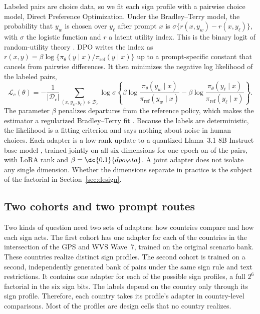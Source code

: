 Labeled pairs are choice data, so we fit each sign profile with a pairwise choice model, Direct Preference Optimization. Under the Bradley--Terry model, the probability that $y_w$ is chosen over $y_\ell$ after prompt $x$ is $\sigma\{r(x,y_w)-r(x,y_\ell)\}$, with $\sigma$ the logistic function and $r$ a latent utility index. This is the binary logit of random-utility theory \citep{bradleyterry1952}. DPO writes the index as $r(x,y)=\beta\log\{\pi_\theta(y\mid x)/\pi_{\mathrm{ref}}(y\mid x)\}$ up to a prompt-specific constant that cancels from pairwise differences. It then minimizes the negative log likelihood of the labeled pairs,
\begin{equation}
\mathcal{L}_c(\theta)=-\frac{1}{|\mathcal{D}_c|}\sum_{(x,y_w,y_\ell)\in\mathcal{D}_c}\log\sigma\!\left\{\beta\log\frac{\pi_\theta(y_w\mid x)}{\pi_{\mathrm{ref}}(y_w\mid x)}-\beta\log\frac{\pi_\theta(y_\ell\mid x)}{\pi_{\mathrm{ref}}(y_\ell\mid x)}\right\}.
\label{eq:dpo}
\end{equation}
The parameter $\beta$ penalizes departures from the reference policy, which makes the estimator a regularized Bradley--Terry fit \citep{rafailov2023}. Because the labels are deterministic, the likelihood is a fitting criterion and says nothing about noise in human choices. Each adapter is a low-rank update to a quantized Llama~3.1 8B Instruct base model \citep{hu2022,dettmers2023}, trained jointly on all six dimensions for one epoch on  of the  pairs, with LoRA rank  and $\beta=\dc{0.1}{dpo_beta}$. A joint adapter does not isolate any single dimension. Whether the dimensions separate in practice is the subject of the factorial in Section~\ref{sec:design}.

\subsection{Two cohorts and two prompt routes}

Two kinds of question need two sets of adapters: how countries compare and how each sign acts. The first cohort has one adapter for each of the  countries in the intersection of the GPS and WVS Wave~7, trained on the original scenario bank. These countries realize  distinct sign profiles. The second cohort is trained on a second, independently generated bank of  pairs under the same sign rule and text restrictions. It contains one adapter for each of the  possible sign profiles, a full $2^6$ factorial in the six sign bits. The labels depend on the country only through its sign profile. Therefore, each country takes its profile's adapter in country-level comparisons. Most of the  profiles are design cells that no country realizes.

